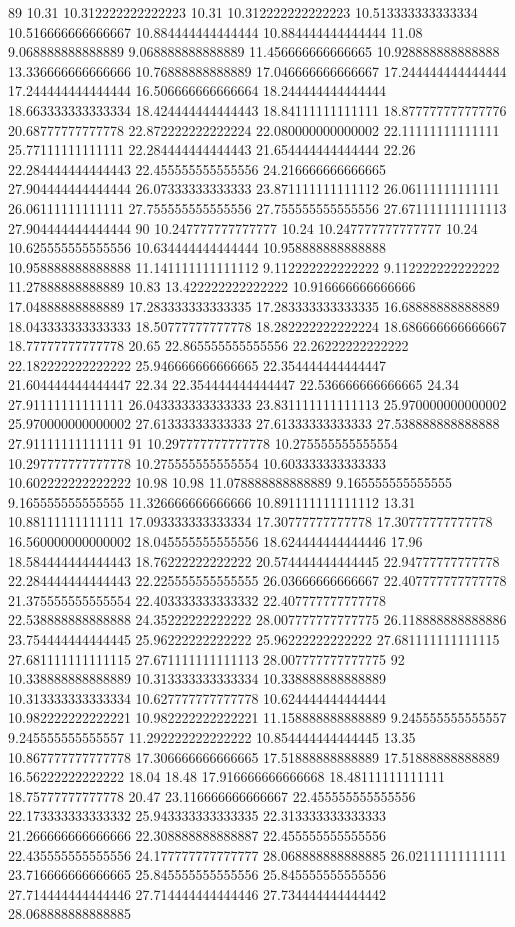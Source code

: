 89 10.31 10.312222222222223 10.31 10.312222222222223 10.513333333333334 10.516666666666667 10.884444444444444 10.884444444444444 11.08 9.068888888888889 9.068888888888889 11.456666666666665 10.928888888888888 13.336666666666666 10.76888888888889 17.046666666666667 17.244444444444444 17.244444444444444 16.506666666666664 18.244444444444444 18.663333333333334 18.424444444444443 18.84111111111111 18.877777777777776 20.68777777777778 22.872222222222224 22.080000000000002 22.11111111111111 25.77111111111111 22.284444444444443 21.654444444444444 22.26 22.284444444444443 22.455555555555556 24.216666666666665 27.904444444444444 26.07333333333333 23.871111111111112 26.06111111111111 26.06111111111111 27.755555555555556 27.755555555555556 27.671111111111113 27.904444444444444
90 10.247777777777777 10.24 10.247777777777777 10.24 10.625555555555556 10.634444444444444 10.958888888888888 10.958888888888888 11.141111111111112 9.112222222222222 9.112222222222222 11.27888888888889 10.83 13.422222222222222 10.916666666666666 17.04888888888889 17.283333333333335 17.283333333333335 16.68888888888889 18.043333333333333 18.50777777777778 18.282222222222224 18.686666666666667 18.77777777777778 20.65 22.865555555555556 22.26222222222222 22.182222222222222 25.946666666666665 22.354444444444447 21.604444444444447 22.34 22.354444444444447 22.536666666666665 24.34 27.91111111111111 26.043333333333333 23.831111111111113 25.970000000000002 25.970000000000002 27.61333333333333 27.61333333333333 27.538888888888888 27.91111111111111
91 10.297777777777778 10.275555555555554 10.297777777777778 10.275555555555554 10.603333333333333 10.602222222222222 10.98 10.98 11.078888888888889 9.165555555555555 9.165555555555555 11.326666666666666 10.891111111111112 13.31 10.88111111111111 17.093333333333334 17.30777777777778 17.30777777777778 16.560000000000002 18.045555555555556 18.624444444444446 17.96 18.584444444444443 18.76222222222222 20.574444444444445 22.94777777777778 22.284444444444443 22.225555555555555 26.03666666666667 22.407777777777778 21.375555555555554 22.403333333333332 22.407777777777778 22.538888888888888 24.35222222222222 28.007777777777775 26.118888888888886 23.754444444444445 25.96222222222222 25.96222222222222 27.681111111111115 27.681111111111115 27.671111111111113 28.007777777777775
92 10.338888888888889 10.313333333333334 10.338888888888889 10.313333333333334 10.627777777777778 10.624444444444444 10.982222222222221 10.982222222222221 11.158888888888889 9.245555555555557 9.245555555555557 11.292222222222222 10.854444444444445 13.35 10.867777777777778 17.306666666666665 17.51888888888889 17.51888888888889 16.56222222222222 18.04 18.48 17.916666666666668 18.48111111111111 18.75777777777778 20.47 23.116666666666667 22.455555555555556 22.173333333333332 25.943333333333335 22.313333333333333 21.266666666666666 22.308888888888887 22.455555555555556 22.435555555555556 24.177777777777777 28.068888888888885 26.02111111111111 23.716666666666665 25.845555555555556 25.845555555555556 27.714444444444446 27.714444444444446 27.734444444444442 28.068888888888885
